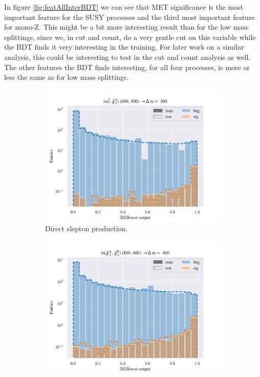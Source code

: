 In figure \ref{fig:featAllInterBDT} we can see that MET significance is the most important feature for the SUSY processes and the third most important feature for mono-Z. This might be a bit more interesting result than for the low mass splittings, since we, in cut and count, do a very gentle cut on this variable while the BDT finds it very interesting in the training. For later work on a similar analysis, this could be interesting to test in the cut and count analysis as well. The other features the BDT finds interesting, for all four processes, is more or less the same as for low mass splittings. 

\begin{figure}[H]
    \centering
    \begin{subfigure}[t!]{0.49\textwidth}
        \includegraphics[width = \textwidth]{Figures/SlepSlep/ML/BDT/All_level/Inter/scaled_train_test_396014.pdf}
        \caption{Direct slepton production.}
        \label{fig:SlepslepInter}
    \end{subfigure}
    \begin{subfigure}[t!]{0.49\textwidth}
        \includegraphics[width = \textwidth]{Figures/SlepSnu/BDT/All_level/Inter/scaled_train_test_397150.pdf}

\end{subfigure}
\end{figure}
